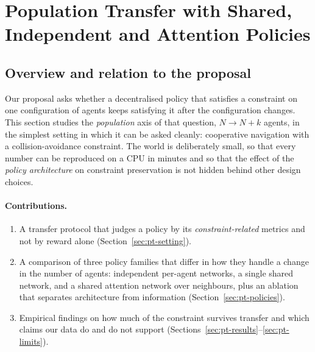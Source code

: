 %
\makeatletter
{}
\makeatother

\section{Population Transfer with Shared, Independent and Attention Policies}
\label{sec:pt}

\subsection{Overview and relation to the proposal}
\label{sec:pt-overview}
Our proposal asks whether a decentralised policy that satisfies a constraint on one configuration of agents
keeps satisfying it after the configuration changes. This section studies the \emph{population} axis of that
question, $N\to N{+}k$ agents, in the simplest setting in which it can be asked cleanly: cooperative
navigation with a collision-avoidance constraint. The world is deliberately small, so that every number can be
reproduced on a CPU in minutes and so that the effect of the \emph{policy architecture} on constraint
preservation is not hidden behind other design choices. 

\paragraph{Contributions.}
\begin{enumerate}
  \item A transfer protocol that judges a policy by its \emph{constraint-related} metrics and not by reward
        alone (Section~\ref{sec:pt-setting}).
  \item A comparison of three policy families that differ in how they handle a change in the number of agents:
        independent per-agent networks, a single shared network, and a shared attention network over neighbours,
        plus an ablation that separates architecture from information (Section~\ref{sec:pt-policies}).
  \item Empirical findings on how much of the constraint survives transfer and which claims our data do and do not
        support (Sections~\ref{sec:pt-results}--\ref{sec:pt-limits}).
\end{enumerate}

